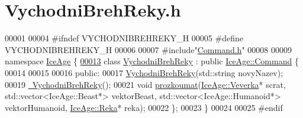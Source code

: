 \hypertarget{VychodniBrehReky_8h_source}{}\section{Vychodni\+Breh\+Reky.\+h}
\label{VychodniBrehReky_8h_source}

\begin{DoxyCode}
00001 
00004 \textcolor{preprocessor}{#ifndef VYCHODNIBREHREKY\_H}
00005 \textcolor{preprocessor}{#define VYCHODNIBREHREKY\_H}
00006 
00007 \textcolor{preprocessor}{#include"\hyperlink{Command_8h}{Command.h}"}
00008 
00009 \textcolor{keyword}{namespace }\hyperlink{namespaceIceAge}{IceAge} \{
\hypertarget{VychodniBrehReky_8h_source.tex_l00013}{}\hyperlink{classIceAge_1_1VychodniBrehReky}{00013}     \textcolor{keyword}{class }\hyperlink{classIceAge_1_1VychodniBrehReky}{VychodniBrehReky} : \textcolor{keyword}{public} \hyperlink{classIceAge_1_1Command}{IceAge::Command} \{
00014 
00015 
00016     \textcolor{keyword}{public}:
00017         \hyperlink{classIceAge_1_1VychodniBrehReky_a9d5257fc3109d8ee985e16c412bbe40d}{VychodniBrehReky}(std::string novyNazev);
00019         \hyperlink{classIceAge_1_1VychodniBrehReky_a3b71658a8879f9961ad778006db54ea9}{~VychodniBrehReky}();
00021         \textcolor{keywordtype}{void} \hyperlink{classIceAge_1_1VychodniBrehReky_a9be648ec1c37e14c3532813685fe1ee1}{prozkoumat}(\hyperlink{classIceAge_1_1Veverka}{IceAge::Veverka}* scrat, std::vector<IceAge::Beast*> 
      vektorBeast, std::vector<IceAge::Humanoid*> vektorHumanoid, \hyperlink{classIceAge_1_1Reka}{IceAge::Reka}* reka);
00022     \};
00023 \}
00024 
00025 \textcolor{preprocessor}{#endif}
\end{DoxyCode}
